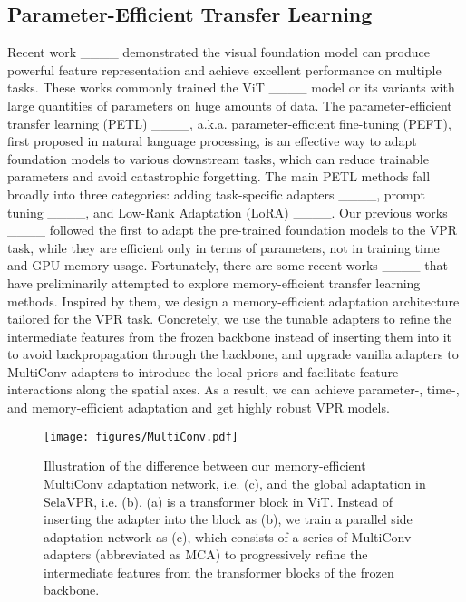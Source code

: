 \subsection{Parameter-Efficient Transfer Learning}
Recent work ____ demonstrated the visual foundation model can produce powerful feature representation and achieve excellent performance on multiple tasks. These works commonly trained the ViT ____ model or its variants with large quantities of parameters on huge amounts of data. The parameter-efficient transfer learning (PETL) ____, a.k.a. parameter-efficient fine-tuning (PEFT), first proposed in natural language processing, is an effective way to adapt foundation models to various downstream tasks, which can reduce trainable parameters and avoid catastrophic forgetting. The main PETL methods fall broadly into three categories: adding task-specific adapters ____, prompt tuning ____, and Low-Rank Adaptation (LoRA) ____. Our previous works ____ followed the first to adapt the pre-trained foundation models to the VPR task, while they are efficient only in terms of parameters, not in training time and GPU memory usage. Fortunately, there are some recent works ____ that have preliminarily attempted to explore memory-efficient transfer learning methods. Inspired by them, we design a memory-efficient adaptation architecture tailored for the VPR task. Concretely, we use the tunable adapters to refine the intermediate features from the frozen backbone instead of inserting them into it to avoid backpropagation through the backbone, and upgrade vanilla adapters to MultiConv adapters to introduce the local priors and facilitate feature interactions along the spatial axes. As a result, we can achieve parameter-, time-, and memory-efficient adaptation and get highly robust VPR models.
\begin{figure*}[!t]
    \centering
    \texttt{[image: figures/MultiConv.pdf]}
    \vspace{-0.2cm}
    \caption{
        Illustration of the difference between our memory-efficient MultiConv adaptation network, i.e. (c), and the global adaptation in SelaVPR, i.e. (b). (a) is a transformer block in ViT. Instead of inserting the adapter into the block as (b), we train a parallel side adaptation network as (c), which consists of a series of MultiConv adapters (abbreviated as MCA) to progressively refine the intermediate features from the transformer blocks of the frozen backbone.
		}
    \vspace{-0.3cm}
    \label{MultiConv}
\end{figure*}
